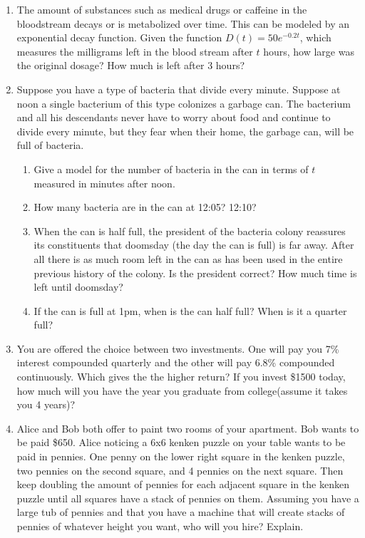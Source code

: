 \documentclass[12pt]{article}
\theoremstyle{plain}     %
\begin{document}
\begin{enumerate}
	\item The amount of substances such as medical drugs or caffeine in the bloodstream decays or is metabolized over time. This can be modeled by an exponential decay function. Given the function $D(t)=50e^{-0.2t}$, which measures the milligrams left in the blood stream after $t$ hours, how large was the original dosage? How much is left after 3 hours?\\
	\item Suppose you have a type of bacteria that divide every minute. Suppose at noon a single bacterium of this type colonizes a garbage can. The bacterium and all his descendants never have to worry about food and continue to divide every minute, but they fear when their home, the garbage can, will be full of bacteria.
		\begin{enumerate}
			\item Give a model for the number of bacteria in the can in terms of $t$ measured in minutes after noon.\\
			\item How many bacteria are in the can at 12:05? 12:10?\\
			\item When the can is half full, the president of the bacteria colony reassures its constituents that doomsday (the day the can is full) is far away. After all there is as much room left in the can as has been used in the entire previous history of the colony. Is the president correct? How much time is left until doomsday?\\
			\item If the can is full at 1pm, when is the can half full? When is it a quarter full?
			\end{enumerate}
		\item You are offered the choice between two investments. One will pay you 7\% interest compounded quarterly and the other will pay 6.8\% compounded continuously. Which gives the the higher return? If you invest \$1500 today, how much will you have the year you graduate from college(assume it takes you 4 years)?\\
		\newpage
		\item Alice and Bob both offer to paint two rooms of your apartment. Bob wants to be paid \$650. Alice noticing a 6x6 kenken puzzle on your table wants to be paid in pennies. One penny on the lower right square in the kenken puzzle, two pennies on the second square, and 4 pennies on the next square. Then keep doubling the amount of pennies for each adjacent square in the kenken puzzle until all squares have a stack of pennies on them. Assuming you have a large tub of pennies and that you have a machine that will create stacks of pennies of whatever height you want, who will you hire? Explain.\\
		

\end{enumerate}
\end{document}
